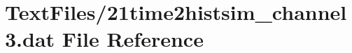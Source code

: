 \hypertarget{21time2histsim__channel3_8dat}{}\section{Text\+Files/21time2histsim\+\_\+channel3.dat File Reference}
\label{21time2histsim__channel3_8dat}
